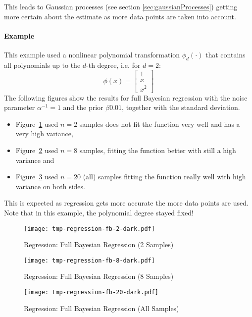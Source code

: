 				This leads to Gaussian processes (see section \ref{sec:gaussianProcesses}) getting more certain about the estimate as more data points are taken into account.

			\paragraph{Example}
				This example used a nonlinear polynomial transformation \( \phi_d(\cdot) \) that contains all polynomials up to the \(d\)-th degree, i.e. for \( d = 2 \):
				\begin{equation}
					\phi(x) =
							\begin{bmatrix}
							1 \\
							x \\
							x^2
						\end{bmatrix}
				\end{equation}
				The following figures show the results for full Bayesian regression with the noise parameter \( \alpha^{-1} = 1 \) and the prior \( \beta 0.01 \), together with the standard deviation.
				\begin{itemize}
					\item Figure~\ref{fig:regressionFb2} used \( n = 2 \) samples does not fit the function very well and has a very high variance,
					\item Figure~\ref{fig:regressionFb8} used \( n = 8 \) samples, fitting the function better with still a high variance and
					\item Figure~\ref{fig:regressionFb20} used \( n = 20 \) (all) samples fitting the function really well with high variance on both sides.
				\end{itemize}
				This is expected as regression gets more accurate the more data points are used. Note that in this example, the polynomial degree stayed fixed!
				
				\begin{figure}
					\centering
					\texttt{[image: tmp-regression-fb-2-dark.pdf]}
					\caption{Regression: Full Bayesian Regression (2 Samples)}
					\label{fig:regressionFb2}
				\end{figure}
				\begin{figure}
					\centering
					\texttt{[image: tmp-regression-fb-8-dark.pdf]}
					\caption{Regression: Full Bayesian Regression (8 Samples)}
					\label{fig:regressionFb8}
				\end{figure}
				\begin{figure}
					\centering
					\texttt{[image: tmp-regression-fb-20-dark.pdf]}
					\caption{Regression: Full Bayesian Regression (All Samples)}
					\label{fig:regressionFb20}
				\end{figure}

